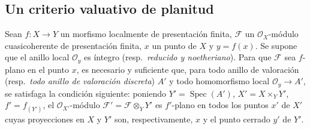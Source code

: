 \subsection{Un criterio valuativo de planitud}
\label{subsection:IV.11.8}

\begin{theorem}[11.8.1]
\label{IV.11.8.1}
Sean $f:X\to Y$ un morfismo localmente de presentación finita, $\mathcal F$ un $\mathcal O_X$-módulo cuasicoherente de presentación finita, $x$ un punto de $X$ y $y=f(x)$.
Se supone que el anillo local $\mathcal O_y$ es íntegro \textup{(resp.\ \emph{reducido y noetheriano})}.
Para que $\mathcal F$ sea $f$-plano en el punto $x$, es necesario y suficiente que, para todo anillo de valoración \textup{(resp.\ \emph{todo anillo de valoración discreta})} $A'$ y todo homomorfismo local $\mathcal O_y\to A'$, se satisfaga la condición siguiente: poniendo $Y'=\operatorname{Spec}(A')$, $X'=X\times_Y Y'$, $f'=f_{(Y')}$, el $\mathcal O_{X'}$-módulo $\mathcal F'=\mathcal F\otimes_Y Y'$ es $f'$-plano en todos los puntos $x'$ de $X'$ cuyas proyecciones en $X$ y $Y'$ son, respectivamente, $x$ y el punto cerrado $y'$ de $Y'$.
\end{theorem}

